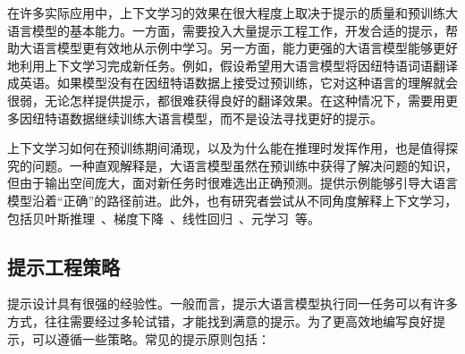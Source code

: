在许多实际应用中，上下文学习的效果在很大程度上取决于提示的质量和预训练大语言模型的基本能力。一方面，需要投入大量提示工程工作，开发合适的提示，帮助大语言模型更有效地从示例中学习。另一方面，能力更强的大语言模型能够更好地利用上下文学习完成新任务。例如，假设希望用大语言模型将因纽特语词语翻译成英语。如果模型没有在因纽特语数据上接受过预训练，它对这种语言的理解就会很弱，无论怎样提供提示，都很难获得良好的翻译效果。在这种情况下，需要用更多因纽特语数据继续训练大语言模型，而不是设法寻找更好的提示。

上下文学习如何在预训练期间涌现，以及为什么能在推理时发挥作用，也是值得探究的问题。一种直观解释是，大语言模型虽然在预训练中获得了解决问题的知识，但由于输出空间庞大，面对新任务时很难选出正确预测。提供示例能够引导大语言模型沿着“正确”的路径前进。此外，也有研究者尝试从不同角度解释上下文学习，包括贝叶斯推理~\cite{xie-etal:2022an}、梯度下降~\cite{dai-etal:2023can,von-etal:2023transformers}、线性回归~\cite{akyurek-etal:2023what}、元学习~\cite{garg-etal:2022can}等。

\subsection{提示工程策略}

\noindent 提示设计具有很强的经验性。一般而言，提示大语言模型执行同一任务可以有许多方式，往往需要经过多轮试错，才能找到满意的提示。为了更高效地编写良好提示，可以遵循一些策略。常见的提示原则包括：

